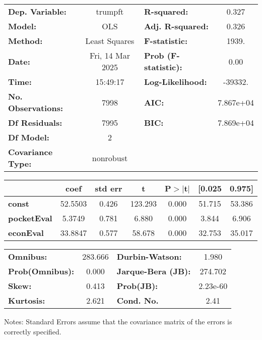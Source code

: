 \begin{center}
\begin{tabular}{lclc}
\toprule
\textbf{Dep. Variable:}    &     trumpft      & \textbf{  R-squared:         } &     0.327   \\
\textbf{Model:}            &       OLS        & \textbf{  Adj. R-squared:    } &     0.326   \\
\textbf{Method:}           &  Least Squares   & \textbf{  F-statistic:       } &     1939.   \\
\textbf{Date:}             & Fri, 14 Mar 2025 & \textbf{  Prob (F-statistic):} &     0.00    \\
\textbf{Time:}             &     15:49:17     & \textbf{  Log-Likelihood:    } &   -39332.   \\
\textbf{No. Observations:} &        7998      & \textbf{  AIC:               } & 7.867e+04   \\
\textbf{Df Residuals:}     &        7995      & \textbf{  BIC:               } & 7.869e+04   \\
\textbf{Df Model:}         &           2      & \textbf{                     } &             \\
\textbf{Covariance Type:}  &    nonrobust     & \textbf{                     } &             \\
\bottomrule
\end{tabular}
\begin{tabular}{lcccccc}
                    & \textbf{coef} & \textbf{std err} & \textbf{t} & \textbf{P$> |$t$|$} & \textbf{[0.025} & \textbf{0.975]}  \\
\midrule
\textbf{const}      &      52.5503  &        0.426     &   123.293  &         0.000        &       51.715    &       53.386     \\
\textbf{pocketEval} &       5.3749  &        0.781     &     6.880  &         0.000        &        3.844    &        6.906     \\
\textbf{econEval}   &      33.8847  &        0.577     &    58.678  &         0.000        &       32.753    &       35.017     \\
\bottomrule
\end{tabular}
\begin{tabular}{lclc}
\textbf{Omnibus:}       & 283.666 & \textbf{  Durbin-Watson:     } &    1.980  \\
\textbf{Prob(Omnibus):} &   0.000 & \textbf{  Jarque-Bera (JB):  } &  274.702  \\
\textbf{Skew:}          &   0.413 & \textbf{  Prob(JB):          } & 2.23e-60  \\
\textbf{Kurtosis:}      &   2.621 & \textbf{  Cond. No.          } &     2.41  \\
\bottomrule
\end{tabular}
\end{center}

Notes: \newline
 [1] Standard Errors assume that the covariance matrix of the errors is correctly specified.